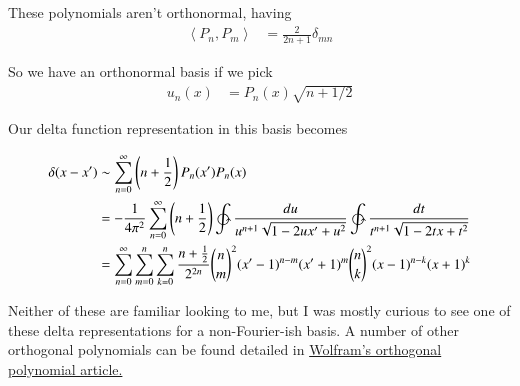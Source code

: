 \documentclass{article}
\newcommand{\Innerprod}[2]{\left\langle{#1}, {#2}\right\rangle}
\begin{document}
These polynomials aren't orthonormal, having 
\begin{align*}
\Innerprod{P_n}{P_m} &= \frac{2}{2 n + 1}\delta_{mn}
\end{align*}

So we have an orthonormal basis if we pick
\begin{align*}
u_n(x) &= P_n(x) \sqrt{n + 1/2}
\end{align*}

Our delta function representation in this basis becomes

\begin{align*}
\delta(x-x') 
&\sim \sum_{n=0}^\infty \left(n+ \inv{2}\right) P_n(x') P_n(x) \\
&= -\inv{4\pi^2} \sum_{n=0}^\infty \left(n+ \inv{2}\right) \ointctrclockwise \frac{du}{u^{n+1}\sqrt{1 - 2u x' + u^2}} \ointctrclockwise \frac{dt}{t^{n+1}\sqrt{1 - 2t x + t^2}} \\
&= \sum_{n=0}^\infty \sum_{m=0}^n \sum_{k=0}^n \frac{n+ \inv{2}}{2^{2n}} {\binom{n}{m}}^2 (x'-1)^{n-m}(x'+1)^m {\binom{n}{k}}^2 (x-1)^{n-k}(x+1)^k
\end{align*}

Neither of these are familiar looking to me, but I was mostly curious to see one of these delta representations for a non-Fourier-ish basis.  A number of other
orthogonal polynomials can be found detailed in \href{http://mathworld.wolfram.com/OrthogonalPolynomials.html}{Wolfram's orthogonal polynomial article.}



\end{document}
